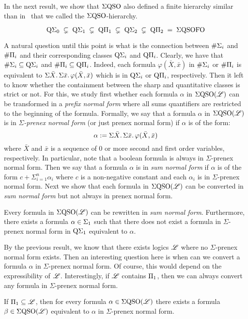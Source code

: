 In the next result, we show that $\Sigma{\rm QSO}$ also defined a finite hierarchy similar than in~\cite{DBLP:journals/jcss/SalujaST95} that we called the $\Sigma{\rm QSO}$-hierarchy.
\begin{proposition}
\[
\operatorname{Q}\!\Sigma_{0} \; \subsetneq \; \operatorname{Q}\!\Sigma_{1} \; \subsetneq \; \operatorname{Q}\!\Pi_{1} \; \subsetneq \; \operatorname{Q}\!\Sigma_{2} \; \subsetneq \; \operatorname{Q}\!\Pi_{2} \; = \; \Sigma{\rm QSO}{{\rm FO}} 
\]
\end{proposition}
A natural question until this point is what is the connection between $\#\Sigma_{i}$ and $\#\Pi_{i}$ and their corresponding classes $\operatorname{Q}\!\Sigma_{i}$ and $\operatorname{Q}\!\Pi_{i}$. Clearly, we have that $\#\Sigma_{i} \subseteq \operatorname{Q}\!\Sigma_{i}$ and $\#\Pi_{i} \subseteq \operatorname{Q}\!\Pi_{i}$. Indeed, each formula $\varphi(\bar{X}, \bar{x})$ in $\#\Sigma_{i}$ or $\#\Pi_{i}$ is equivalent to $\Sigma{\bar X}.\, \Sigma{\bar x}.\, \varphi(\bar{X}, \bar{x})$ which is in $\operatorname{Q}\!\Sigma_{i}$ or $\operatorname{Q}\!\Pi_{i}$, respectively. 
Then it left to know whether the containment between the sharp and quantitative classes is strict or not. 
For this, we study first whether each formula $\alpha$ in $\Sigma{\rm QSO}(\mathscr{L})$ can be transformed in a \emph{prefix normal form} where all sums quantifiers are restricted to the beginning of the formula. 
Formally, we say that a formula $\alpha$ in $\Sigma{\rm QSO}(\mathscr{L})$ is in \emph{$\Sigma$-prenex normal form} (or just prenex normal form) if $\alpha$ is of the form:
\[
\alpha := \Sigma{\bar{X}}.\, \Sigma{\bar{x}}.\, \varphi(\bar{X}, \bar{x})
\]
where $\bar{X}$ and $\bar{x}$ is a sequence of $0$ or more second and first order variables, respectively.
In particular, note that a boolean formula is always in $\Sigma$-prenex normal form.
Then we say that a formula $\alpha$ is in \emph{sum normal form} if $\alpha$ is of the form $c + \Sigma_{i=1}^n \alpha_i$ where $c$ is a non-negative constant and each $\alpha_i$ is in $\Sigma$-prenex normal form.
Next we show that each formula in $\Sigma{\rm QSO}(\mathscr{L})$ can be converted in \emph{sum normal form} but not always in prenex normal form.
\begin{theorem}
	Every formula in $\Sigma{\rm QSO}(\mathscr{L})$ can be rewritten in \emph{sum normal form}. Furthermore, there exists a formula $\alpha \in \Sigma_{1}$ such that there does not exist a formula in $\Sigma$-prenex normal form in $\operatorname{Q}\!\Sigma_{1}$ equivalent to $\alpha$.
\end{theorem}

By the previous result, we know that there exists logics $\mathscr{L}$ where no $\Sigma$-prenex normal form exists. 
Then an interesting question here is when can we convert a formula $\alpha$ in $\Sigma$-prenex normal form. 
Of course, this would depend on the expressibility of $\mathscr{L}$.
Interestingly, if $\mathscr{L}$ contains $\Pi_{1}$, then we can always convert any formula in $\Sigma$-prenex normal form. 
\begin{theorem}
	If $\Pi_{1} \subseteq \mathscr{L}$, then for every formula $\alpha \in \Sigma{\rm QSO}(\mathscr{L})$ there exists a formula $\beta \in \Sigma{\rm QSO}(\mathscr{L})$ equivalent to $\alpha$ in $\Sigma$-prenex normal form.
\end{theorem}

